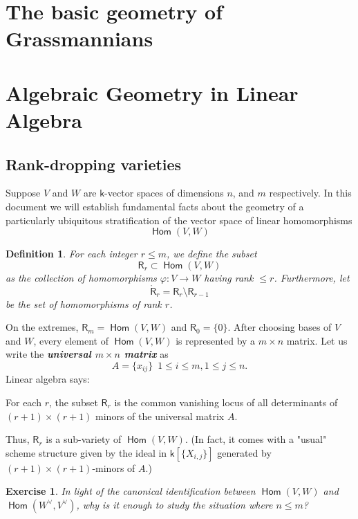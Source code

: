 \documentclass[11pt]{article}
\renewcommand{\k}{\mathsf{k}}
\renewcommand{\to}{\longrightarrow}
\DeclareMathOperator{\Hom}{\mathsf{Hom}}
\renewcommand{\k}{\mathsf{k}}
\renewcommand{\to}{{\longrightarrow}}
\newtheorem{definition}{Definition}[section]
\newtheorem{exercise}{Exercise}[section]
\begin{document}
\section{The basic geometry of Grassmannians}
\label{sec:org4e90a75}
\section{Algebraic Geometry in Linear Algebra}
\label{sec:orged4e243}
\subsection{Rank-dropping varieties}
\label{sec:orgc375af0}

Suppose \(V\) and \(W\) are \(\k\)-vector spaces of dimensions \(n\), and \(m\) respectively.  In this document we will establish fundamental facts about the geometry of a particularly ubiquitous stratification of the vector space of linear homomorphisms \[\Hom(V,W)\]


\begin{definition}
For each integer \(r \leq m\), we define the subset $$\mathsf{R}_{r} \subset \Hom(V,W)$$ as the collection of homomorphisms \(\varphi: V \to W\) having rank \(\leq r\).  Furthermore, let $$\mathring{\mathsf{R}}_{r} = \mathsf{R}_{r}\setminus \mathsf{R}_{r-1}$$ be the set of homomorphisms of rank \(r\).
\end{definition}


On the extremes, \(\mathsf{R}_m = \Hom(V,W)\) and \(\mathsf{R}_{0} = \{0\}\).  After choosing bases of \(V\) and \(W\), every element of \(\Hom(V,W)\) is represented by a \(m \times n\) matrix. Let us write the \textbf{\emph{universal \(m \times n\) matrix}} as 
\[A = \big\{ x_{ij} \big\} \,\,\,  1 \leq i \leq m, 1 \leq j \leq n.\]
Linear algebra says: 

For each \(r\), the subset \(\mathsf{R}_{r}\) is the common vanishing locus of all determinants of \((r+1) \times (r+1)\) minors of the universal matrix \(A\).

Thus, \(\mathsf{R}_{r}\) is a sub-variety of \(\Hom(V,W)\).  (In fact, it comes with a "usual" scheme structure given by the ideal in \(\k\left[\{X_{i,j}\}\right]\) generated by \((r+1) \times (r+1)\)-minors of \(A\).) 



\begin{exercise}
In light of the canonical identification between \(\Hom(V,W)\) and \(\Hom(W^{\vee},V^{\vee})\), why is it enough to study the situation where \(n \leq m\)?
\end{exercise}
\end{document}
